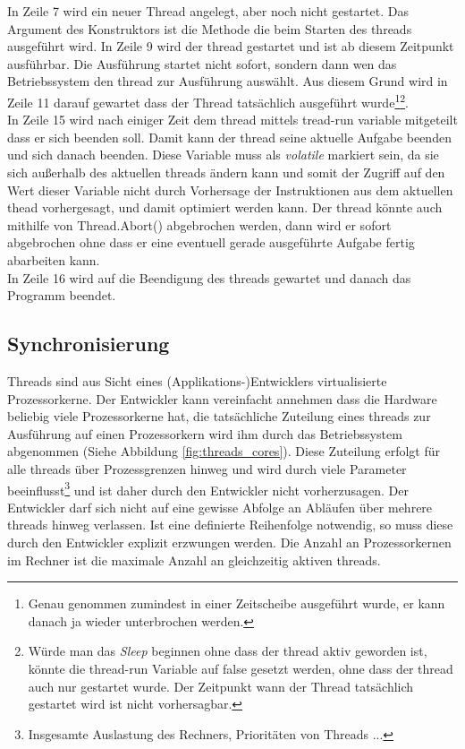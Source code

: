 In Zeile 7 wird ein neuer Thread angelegt, aber noch nicht gestartet. Das Argument des Konstruktors ist die Methode die beim Starten des threads ausgeführt wird. In Zeile 9 wird der thread gestartet und ist ab diesem Zeitpunkt ausführbar. Die Ausführung startet nicht sofort, sondern dann wen das Betriebssystem den thread zur Ausführung auswählt. Aus diesem Grund wird in Zeile 11 darauf gewartet dass der Thread tatsächlich ausgeführt wurde\footnote{Genau genommen zumindest in einer Zeitscheibe ausgeführt wurde, er kann danach ja wieder unterbrochen werden.}\footnote{Würde man das \textit{Sleep} beginnen ohne dass der thread aktiv geworden ist, könnte die thread-run Variable auf false gesetzt werden, ohne dass der thread auch nur gestartet wurde. Der Zeitpunkt wann der Thread tatsächlich gestartet wird ist nicht vorhersagbar.}.
\\In Zeile 15 wird nach einiger Zeit dem thread mittels tread-run variable mitgeteilt dass er sich beenden soll. Damit kann der thread seine aktuelle Aufgabe beenden und sich danach beenden. Diese Variable muss als \emph{volatile} markiert sein, da sie sich außerhalb des aktuellen threads ändern kann und somit der Zugriff auf den Wert dieser Variable nicht durch Vorhersage der Instruktionen aus dem aktuellen thead vorhergesagt, und damit optimiert werden kann.\parencite{ms_volatile} Der thread könnte auch mithilfe von Thread.Abort() abgebrochen werden, dann wird er sofort abgebrochen ohne dass er eine eventuell gerade ausgeführte Aufgabe fertig abarbeiten kann. 
\\In Zeile 16 wird auf die Beendigung des threads gewartet und danach das Programm beendet.


\subsection{Synchronisierung}
Threads sind aus Sicht eines (Applikations-)Entwicklers virtualisierte Prozessorkerne. Der Entwickler kann vereinfacht annehmen dass die Hardware beliebig viele Prozessorkerne hat, die tatsächliche Zuteilung eines threads zur Ausführung auf einen Prozessorkern wird ihm durch das Betriebssystem abgenommen (Siehe Abbildung \ref{fig:threads_cores}). Diese Zuteilung erfolgt für alle threads über Prozessgrenzen hinweg und wird durch viele Parameter beeinflusst\footnote{Insgesamte Auslastung des Rechners, Prioritäten von Threads ...} und ist daher durch den Entwickler nicht vorherzusagen. Der Entwickler darf sich nicht auf eine gewisse Abfolge an Abläufen über mehrere threads hinweg verlassen. Ist eine definierte Reihenfolge notwendig, so muss diese durch den Entwickler explizit erzwungen werden. Die Anzahl an Prozessorkernen im Rechner ist die maximale Anzahl an gleichzeitig aktiven threads.\parencite[S. 140]{Dahlin2012}

